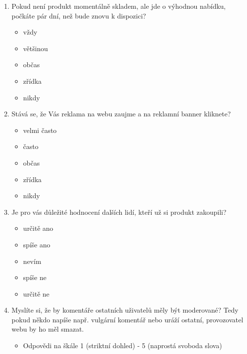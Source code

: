 \documentclass[12pt,twoside,openany]{fithesis}
\begin{document}
\begin{enumerate}
  \item Pokud není produkt momentálně skladem, ale jde o výhodnou nabídku, počkáte pár dní, než bude znovu k dispozici?
    \begin{itemize}
       \item vždy
       \item většinou
       \item občas
       \item zřídka
       \item nikdy
    \end{itemize}

  \item Stává se, že Vás reklama na webu zaujme a na reklamní banner kliknete?
    \begin{itemize}
       \item velmi často
       \item často
       \item občas
       \item zřídka
       \item nikdy
    \end{itemize}

  \item Je pro vás důležité hodnocení dalších lidí, kteří už si produkt zakoupili?
    \begin{itemize}
       \item určitě ano
       \item spíše ano
       \item nevím
       \item spíše ne
       \item určitě ne
    \end{itemize}

  \item Myslíte si, že by komentáře ostatních uživatelů měly být moderované?
      Tedy pokud někdo napíše např. vulgární komentář nebo uráží ostatní, provozovatel webu by ho měl smazat.
    \begin{itemize}
        \item Odpovědi na škále 1 (striktní dohled) - 5 (naprostá svoboda slova)
    \end{itemize}

\end{enumerate}
\end{document}
